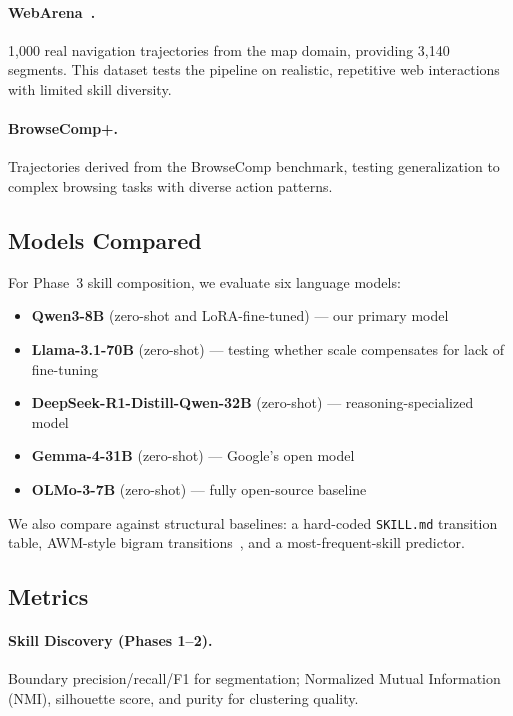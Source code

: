 \documentclass{article}
\begin{document}
\paragraph{WebArena~\cite{zhou2024webarena}.} 1,000 real navigation trajectories from the map domain, providing 3,140 segments. This dataset tests the pipeline on realistic, repetitive web interactions with limited skill diversity.

\paragraph{BrowseComp+.} Trajectories derived from the BrowseComp benchmark, testing generalization to complex browsing tasks with diverse action patterns.

\subsection{Models Compared}

For Phase~3 skill composition, we evaluate six language models:
\begin{itemize}
    \item \textbf{Qwen3-8B} (zero-shot and LoRA-fine-tuned) --- our primary model
    \item \textbf{Llama-3.1-70B} (zero-shot) --- testing whether scale compensates for lack of fine-tuning
    \item \textbf{DeepSeek-R1-Distill-Qwen-32B} (zero-shot) --- reasoning-specialized model
    \item \textbf{Gemma-4-31B} (zero-shot) --- Google's open model
    \item \textbf{OLMo-3-7B} (zero-shot) --- fully open-source baseline
\end{itemize}

We also compare against structural baselines: a hard-coded \texttt{SKILL.md} transition table, AWM-style bigram transitions~\cite{wang2024awm}, and a most-frequent-skill predictor.

\subsection{Metrics}

\paragraph{Skill Discovery (Phases 1--2).} Boundary precision/recall/F1 for segmentation; Normalized Mutual Information (NMI), silhouette score, and purity for clustering quality.
\end{document}
